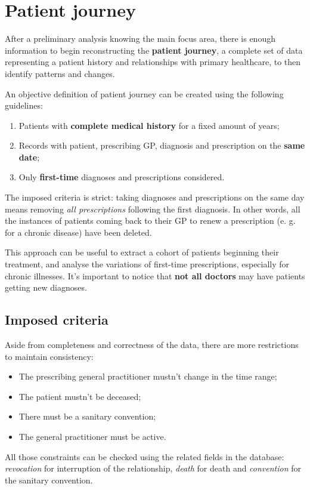 \chapter{Patient journey}
After a preliminary analysis knowing the main focus area, there is enough information to begin reconstructing the \textbf{patient journey}, a complete set of data representing a patient history and relationships with primary healthcare, to then identify patterns and changes. 

An objective definition of patient journey can be created using the following guidelines:
\begin{enumerate}
	\item Patients with \textbf{complete medical history} for a fixed amount of years;
	\item Records with patient, prescribing GP, diagnosis and prescription on the \textbf{same date};
	\item Only \textbf{first-time} diagnoses and prescriptions considered.
\end{enumerate}

The imposed criteria is strict: taking diagnoses and prescriptions on the same day means removing \textit{all prescriptions} following the first diagnosis. In other words, all the instances of patients coming back to their GP to renew a prescription (e. g. for a chronic disease) have been deleted.

This approach can be useful to extract a cohort of patients beginning their treatment, and analyse the variations of first-time prescriptions, especially for chronic illnesses. It's important to notice that \textbf{not all doctors} may have patients getting new diagnoses.

\section{Imposed criteria}
Aside from completeness and correctness of the data, there are more restrictions to maintain consistency:
\begin{itemize}
	\item The prescribing general practitioner mustn't change in the time range;
	\item The patient mustn't be deceased;
	\item There must be a sanitary convention;
	\item The general practitioner must be active.
\end{itemize}

All those constraints can be checked using the related fields in the database: \textit{revocation} for interruption of the relationship, \textit{death} for death and \textit{convention} for the sanitary convention.

